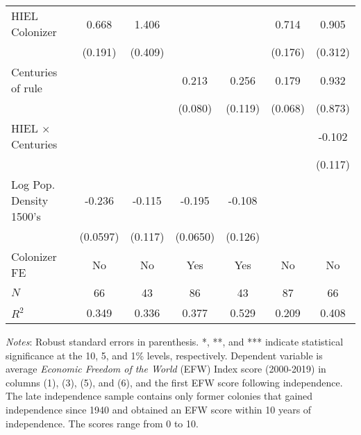 \begin{sidewaystable}[h!]
\begin{threeparttable}
\begin{center}
\begin{minipage}{\textwidth}
\begin{tabular*}{\textwidth}{@{\extracolsep{\fill}}lcccc|cc@{\extracolsep{\fill}}}
HIEL Colonizer &       0.668\sym{***}&       1.406\sym{***}&                     &                     &       0.714\sym{***}&       0.905\sym{***}\\
            &     (0.191)         &     (0.409)         &                     &                     &     (0.176)         &     (0.312)         \\
[0.125em]
Centuries of rule &                     &                     &       0.213\sym{***}&       0.256\sym{**} &       0.179\sym{**} &       0.932         \\
            &                     &                     &    (0.080)         &     (0.119)         &    (0.068)         &     (0.873)         \\
HIEL $\times$ Centuries &                     &                     &                     &                     &                     &      -0.102         \\
            &                     &                     &                     &                     &                     &     (0.117)         \\
[0.125em]
Log Pop. Density 1500's   &      -0.236\sym{***}&      -0.115         &      -0.195\sym{***}&      -0.108         &                     &                     \\
            &    (0.0597)         &     (0.117)         &    (0.0650)         &     (0.126)         &                     &                     \\
[0.25em]
Colonizer FE & No & No & Yes & Yes & No & No\\
\hline
\(N\)       &          66         &          43         &          86         &          43         &          87         &          66         \\
\(R^{2}\)   &       0.349         &       0.336         &       0.377         &       0.529         &       0.209         &       0.408         \\
\hline
\end{tabular*}
\begin{tablenotes}
\small
\item \textit{Notes}: Robust standard errors in parenthesis. *, **, and *** indicate statistical significance at the 10, 5, and 1\% levels, respectively. Dependent variable is average \textit{Economic Freedom of the World} (EFW) Index score (2000-2019) in columns (1), (3), (5), and (6), and the first EFW score following independence. The late independence sample contains only former colonies that gained independence since 1940 and obtained an EFW score within 10 years of independence. The scores range from 0 to 10. 
\end{tablenotes}
\end{minipage}
\end{center}
\end{threeparttable}
\end{sidewaystable}